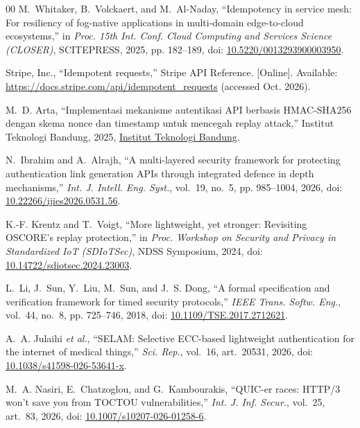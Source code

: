 \documentclass[conference]{IEEEtran}
\begin{document}
\begin{thebibliography}{00}
M.~Whitaker, B.~Volckaert, and M.~Al-Naday, ``Idempotency in service mesh: For resiliency of fog-native applications in multi-domain edge-to-cloud ecosystems,'' in \emph{Proc. 15th Int. Conf. Cloud Computing and Services Science (CLOSER)}, SCITEPRESS, 2025, pp. 182--189, doi: \href{https://doi.org/10.5220/0013293900003950}{10.5220/0013293900003950}.

Stripe, Inc., ``Idempotent requests,'' Stripe API Reference. [Online]. Available: \href{https://docs.stripe.com/api/idempotent\_requests}{https://docs.stripe.com/api/idempotent\_requests} (accessed Oct. 2026).

M.~D. Arta, ``Implementasi mekanisme autentikasi API berbasis HMAC-SHA256 dengan skema nonce dan timestamp untuk mencegah replay attack,'' Institut Teknologi Bandung, 2025, \href{https://informatika.stei.itb.ac.id/~rinaldi.munir/Kriptografi/2025-2026/Makalah2025/Makalah-IF4020-Kriptografi-2025%20(37).pdf}{Institut Teknologi Bandung}.

N.~Ibrahim and A.~Alrajh, ``A multi-layered security framework for protecting authentication link generation APIs through integrated defence in depth mechanisms,'' \emph{Int. J. Intell. Eng. Syst.}, vol.~19, no.~5, pp. 985--1004, 2026, doi: \href{https://doi.org/10.22266/ijies2026.0531.56}{10.22266/ijies2026.0531.56}.

K.-F. Krentz and T.~Voigt, ``More lightweight, yet stronger: Revisiting OSCORE's replay protection,'' in \emph{Proc. Workshop on Security and Privacy in Standardized IoT (SDIoTSec)}, NDSS Symposium, 2024, doi: \href{https://doi.org/10.14722/sdiotsec.2024.23003}{10.14722/sdiotsec.2024.23003}.

L.~Li, J.~Sun, Y.~Liu, M.~Sun, and J.~S. Dong, ``A formal specification and verification framework for timed security protocols,'' \emph{IEEE Trans. Softw. Eng.}, vol.~44, no.~8, pp. 725--746, 2018, doi: \href{https://doi.org/10.1109/TSE.2017.2712621}{10.1109/TSE.2017.2712621}.

A.~A. Julaihi \emph{et al.}, ``SELAM: Selective ECC-based lightweight authentication for the internet of medical things,'' \emph{Sci. Rep.}, vol.~16, art.~20531, 2026, doi: \href{https://doi.org/10.1038/s41598-026-53641-x}{10.1038/s41598-026-53641-x}.

M.~A. Nasiri, E.~Chatzoglou, and G.~Kambourakis, ``QUIC-er races: HTTP/3 won't save you from TOCTOU vulnerabilities,'' \emph{Int. J. Inf. Secur.}, vol.~25, art.~83, 2026, doi: \href{https://doi.org/10.1007/s10207-026-01258-6}{10.1007/s10207-026-01258-6}.


\end{thebibliography}
\end{document}
